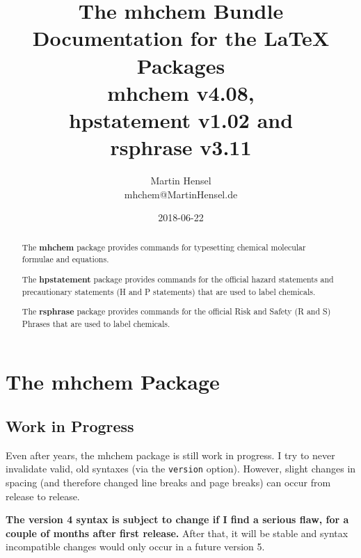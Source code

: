 \documentclass[a4paper,notitlepage,parskip=half]{scrreprt}
\begin{document}
\title{%
  The mhchem Bundle\\[0.3em]
  \Large\textmd{%
    Documentation for the \LaTeX{} Packages\\
    mhchem v4.08,\\%
    hpstatement v1.02 and\\
    rsphrase v3.11}%
}
\author{%
  Martin Hensel\\
  mhchem\makebox[0pt][l]{\textcolor{white}{NOSPAM}}@MartinHensel\makebox[1pt][l]{\textcolor{white}{.}}.de%
}
\date{%
  2018-06-22%
}
\maketitle

\vfill

\begin{abstract}
  \noindent
  The \textbf{mhchem} package provides commands for typesetting chemical molecular formulae and equations.

  \medskip
  \noindent The \textbf{hpstatement} package provides commands for the official hazard statements and precautionary statements (H and P statements) that are used to label chemicals.

  \medskip
  \noindent
  The \textbf{rsphrase} package provides commands for the official Risk and Safety (R and S) Phrases that are used to label chemicals.
\end{abstract}



\clearpage
\tableofcontents



\clearpage
\chapter{The mhchem Package}


\section{Work in Progress}

Even after years, the mhchem package is still work in progress. I try to never invalidate valid, old syntaxes (via the \verb|version| option). However, slight changes in spacing (and therefore changed line breaks and page breaks) can occur from release to release.

\textbf{The version 4 syntax is subject to change if I find a serious flaw, for a couple of months after first release.} After that, it will be stable and  syntax incompatible changes would only occur in a future version 5.
\end{document}
